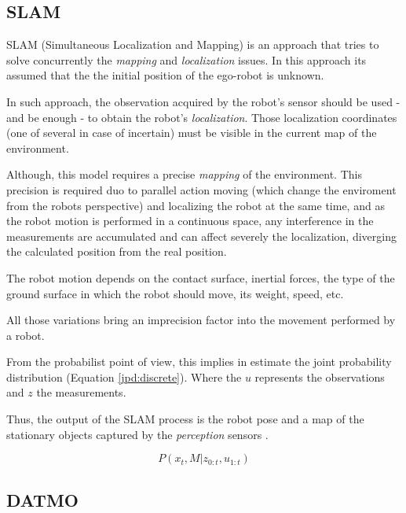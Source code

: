 \subsection{SLAM}

SLAM (Simultaneous Localization and Mapping) is an approach that tries to solve concurrently the \textit{mapping} and \textit{localization} issues\cite{VU-2009-454238}. In this approach its assumed that the the initial position of the ego-robot is unknown. 

In such approach,  the observation acquired by the robot's sensor should be used - and be enough - to obtain the robot's \textit{localization}. Those localization coordinates (one of several in case of incertain) must be visible in the current map of the environment. 

Although, this model requires a precise \textit{mapping} of the environment. This precision is required duo to parallel action moving (which change the enviroment from the robots perspective) and localizing the robot at the same time, and as the robot motion is performed in a continuous space, any interference in the measurements are accumulated and can affect severely the localization, diverging the calculated position from the real position.

The robot motion depends on the contact surface, inertial forces, the type of the ground surface in which the robot should move, its weight, speed, etc.

All those variations bring an imprecision factor into the movement performed by a robot.

From the probabilist point of view, this implies in estimate the joint probability distribution (Equation \ref{jpd:discrete}). Where the $u$ represents the observations and $z$ the measurements.

Thus, the output of the SLAM process is the robot pose and a map of the stationary objects captured by the \textit{perception} sensors \cite{iyengar1991autonomous}.


\begin{equation}
\label{jpd:discrete}
P(x_t,M | z_{0:t}, u_{1:t})
\end{equation}


\subsection{DATMO}

